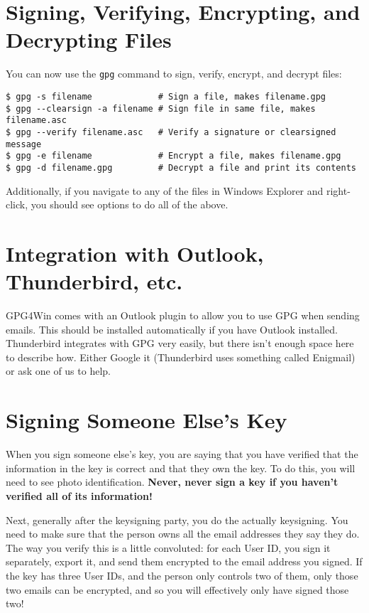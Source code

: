 \documentclass{article}
\begin{document}
\section*{Signing, Verifying, Encrypting, and Decrypting Files}
You can now use the \texttt{gpg} command to sign, verify, encrypt, and
decrypt files:

\begin{lstlisting}
$ gpg -s filename             # Sign a file, makes filename.gpg
$ gpg --clearsign -a filename # Sign file in same file, makes filename.asc
$ gpg --verify filename.asc   # Verify a signature or clearsigned message
$ gpg -e filename             # Encrypt a file, makes filename.gpg
$ gpg -d filename.gpg         # Decrypt a file and print its contents
\end{lstlisting}

Additionally, if you navigate to any of the files in Windows Explorer
and right-click, you should see options to do all of the above.

\section*{Integration with Outlook, Thunderbird, etc.}
GPG4Win comes with an Outlook plugin to allow you to use GPG when
sending emails.  This should be installed automatically if you have
Outlook installed.  Thunderbird integrates with GPG very easily, but
there isn't enough space here to describe how.  Either Google it
(Thunderbird uses something called Enigmail) or ask one of us to help.

\section*{Signing Someone Else's Key}
When you sign someone else's key, you are saying that you have
verified that the information in the key is correct and that they own
the key.  To do this, you will need to see photo identification.
\textbf{Never, never sign a key if you haven't verified all of its
  information!}

Next, generally after the keysigning party, you do the actually
keysigning.  You need to make sure that the person owns all the email
addresses they say they do.  The way you verify this is a little
convoluted: for each User ID, you sign it separately, export it, and
send them encrypted to the email address you signed.  If the key has
three User IDs, and the person only controls two of them, only those
two emails can be encrypted, and so you will effectively only have
signed those two!
\end{document}
